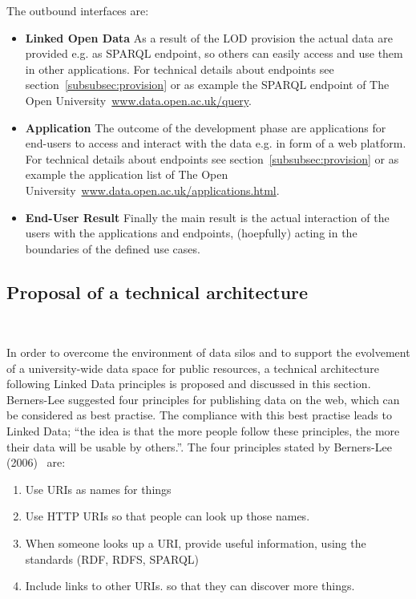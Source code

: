 The outbound interfaces are:

\begin{itemize}
	\item \textbf{Linked Open Data}\newline
	As a result of the LOD provision the actual data are provided e.g. as SPARQL endpoint, so others can easily access and use them in other applications. For technical details about endpoints see section~\ref{subsubsec:provision} or as example the SPARQL endpoint of The Open University~\url{www.data.open.ac.uk/query}.
	\item \textbf{Application}\newline
	The outcome of the development phase are applications for end-users to access and interact with the data e.g. in form of a web platform. For technical details about endpoints see section~\ref{subsubsec:provision} or as example the application list of The Open University~\url{www.data.open.ac.uk/applications.html}.
	\item \textbf{End-User Result}\newline
	Finally the main result is the actual interaction of the users with the applications and endpoints, (hoepfully) acting in the boundaries of the defined use cases.
\end{itemize}

\newpage

\subsection{Proposal of a technical architecture}~\label{subsection:proposal_technical_architecture}

In order to overcome the environment of data silos and to support the evolvement of a university-wide data space for public resources, a technical architecture following Linked Data principles is proposed and discussed in this section. Berners-Lee suggested four principles for publishing data on the web, which can be considered as best practise. The compliance with this best practise leads to Linked Data; \enquote{the idea is that the more people follow these principles, the more their data will be usable by others.}\cite{simperl_using_2013}. The four principles stated by Berners-Lee (2006)~\cite{article:bernerslee_2006} are:
\begin{enumerate}
	\item Use URIs as names for things
	\item Use HTTP URIs so that people can look up those names.
	\item When someone looks up a URI, provide useful information, using the standards (RDF, RDFS, SPARQL)
	\item Include links to other URIs. so that they can discover more things.
\end{enumerate}

